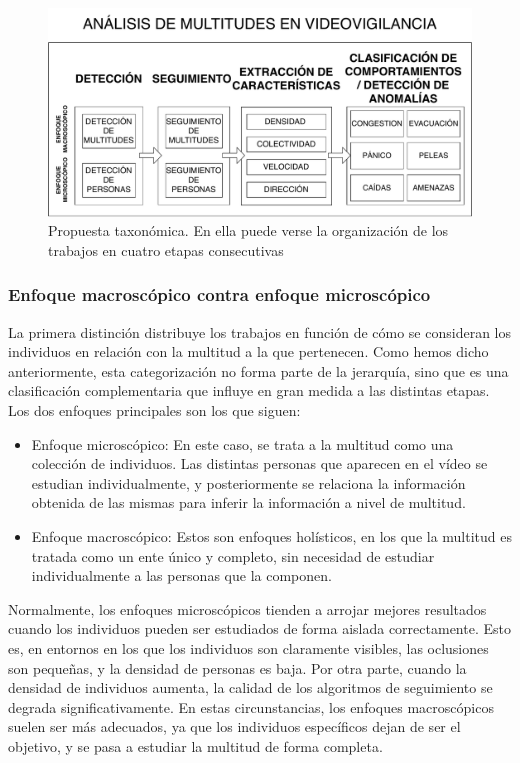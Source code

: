 \documentclass[../main.tex]{memoir}
\begin{document}
\begin{figure}[hbtp]
  \centering
  \includegraphics[width=.9\textwidth]{images/taxonomy_steps.pdf}
  \caption{Propuesta taxonómica. En ella puede verse la organización
    de los trabajos en cuatro etapas consecutivas}
  \label{fig:pipeline}
\end{figure}

\subsubsection{Enfoque macroscópico contra enfoque microscópico}

La primera distinción distribuye los trabajos en función de cómo se
consideran los individuos en relación con la multitud a la que
pertenecen. Como hemos dicho anteriormente, esta categorización no
forma parte de la jerarquía, sino que es una clasificación
complementaria que influye en gran medida a las distintas etapas. Los
dos enfoques principales son los que siguen:

\begin{itemize}
\item Enfoque microscópico: En este caso, se trata a la multitud como
  una colección de individuos. Las distintas personas que aparecen en
  el vídeo se estudian individualmente, y posteriormente se relaciona
  la información obtenida de las mismas para inferir la información a
  nivel de multitud.
\item Enfoque macroscópico: Estos son enfoques holísticos, en los que
  la multitud es tratada como un ente único y completo, sin necesidad
  de estudiar individualmente a las personas que la componen.
\end{itemize}

Normalmente, los enfoques microscópicos tienden a arrojar mejores
resultados cuando los individuos pueden ser estudiados de forma
aislada correctamente. Esto es, en entornos en los que los individuos
son claramente visibles, las oclusiones son pequeñas, y la densidad de
personas es baja. Por otra parte, cuando la densidad de individuos
aumenta, la calidad de los algoritmos de seguimiento se degrada
significativamente. En estas circunstancias, los enfoques
macroscópicos suelen ser más adecuados, ya que los individuos
específicos dejan de ser el objetivo, y se pasa a estudiar la multitud
de forma completa.
\end{document}
